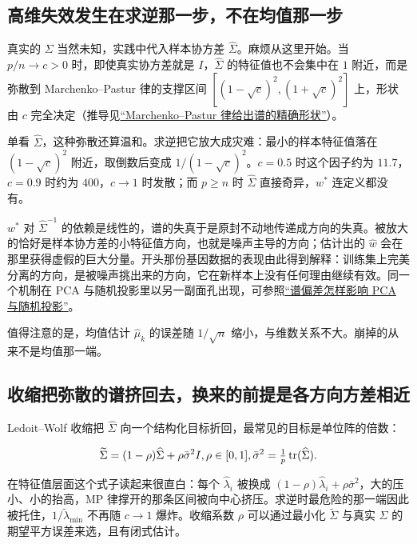 \subsection{高维失效发生在求逆那一步，不在均值那一步}

真实的 \(\Sigma\) 当然未知，实践中代入样本协方差 \(\widehat\Sigma\)。麻烦从这里开始。当 \(p/n\to c>0\) 时，即使真实协方差就是 \(I\)，\(\widehat\Sigma\) 的特征值也不会集中在 \(1\) 附近，而是弥散到 Marchenko--Pastur 律的支撑区间 \([(1-\sqrt c)^2,(1+\sqrt c)^2]\) 上，形状由 \(c\) 完全决定（推导见\hyperref[sec:11-Mathematical-Statistics/09-Random-Matrix-Theory/02]{``Marchenko--Pastur 律给出谱的精确形状''}）。

单看 \(\widehat\Sigma\)，这种弥散还算温和。求逆把它放大成灾难：最小的样本特征值落在 \((1-\sqrt c)^2\) 附近，取倒数后变成 \(1/(1-\sqrt c)^2\)。\(c=0.5\) 时这个因子约为 \(11.7\)，\(c=0.9\) 时约为 \(400\)，\(c\to1\) 时发散；而 \(p\ge n\) 时 \(\widehat\Sigma\) 直接奇异，\(w^{\ast}\) 连定义都没有。

\(w^{\ast}\) 对 \(\widehat\Sigma^{-1}\) 的依赖是线性的，谱的失真于是原封不动地传递成方向的失真。被放大的恰好是样本协方差的小特征值方向，也就是噪声主导的方向；估计出的 \(\widehat w\) 会在那里获得虚假的巨大分量。开头那份基因数据的表现由此得到解释：训练集上完美分离的方向，是被噪声挑出来的方向，它在新样本上没有任何理由继续有效。同一个机制在 PCA 与随机投影里以另一副面孔出现，可参照\hyperref[sec:11-Mathematical-Statistics/09-Random-Matrix-Theory/03]{``谱偏差怎样影响 PCA 与随机投影''}。

值得注意的是，均值估计 \(\widehat\mu_k\) 的误差随 \(1/\sqrt{n}\) 缩小，与维数关系不大。崩掉的从来不是均值那一端。

\subsection{收缩把弥散的谱挤回去，换来的前提是各方向方差相近}

Ledoit--Wolf 收缩把 \(\widehat\Sigma\) 向一个结构化目标折回，最常见的目标是单位阵的倍数：

\[
\widetilde\Sigma=(1-\rho)\widehat\Sigma+\rho\bar\sigma^2I,
\space\rho\in[0,1],\space
\bar\sigma^2=\tfrac1p\operatorname{tr}(\widehat\Sigma).
\]

在特征值层面这个式子读起来很直白：每个 \(\widehat\lambda_i\) 被换成 \((1-\rho)\widehat\lambda_i+\rho\bar\sigma^2\)，大的压小、小的抬高，MP 律撑开的那条区间被向中心挤压。求逆时最危险的那一端因此被托住，\(1/\widetilde\lambda_{\min}\) 不再随 \(c\to1\) 爆炸。收缩系数 \(\rho\) 可以通过最小化 \(\widetilde\Sigma\) 与真实 \(\Sigma\) 的期望平方误差来选，且有闭式估计。

